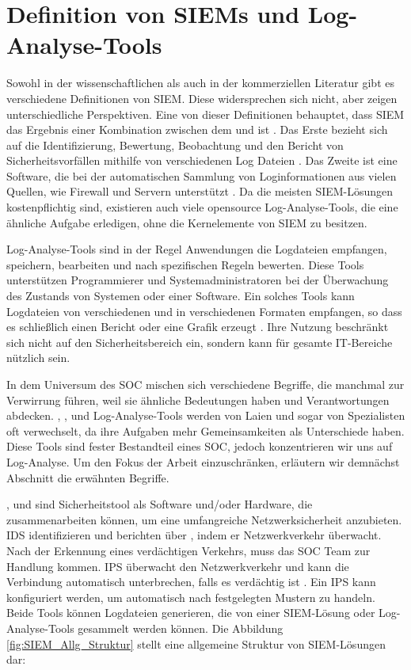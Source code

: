 \section{Definition von SIEMs und Log-Analyse-Tools}

Sowohl in der wissenschaftlichen als auch in der kommerziellen Literatur gibt es verschiedene Definitionen von \gls{SIEM}. Diese widersprechen sich nicht, aber zeigen unterschiedliche Perspektiven. Eine von dieser Definitionen behauptet, dass \gls{SIEM} das Ergebnis einer Kombination zwischen dem  und  ist \citep{Dorigo_SIEM}. Das Erste bezieht sich auf die Identifizierung, Bewertung, Beobachtung und den Bericht von Sicherheitsvorfällen mithilfe von verschiedenen Log Dateien \citep{techopedia_SEM}. Das Zweite ist eine Software, die bei der automatischen Sammlung von Loginformationen aus vielen Quellen, wie Firewall und Servern unterstützt \citep{techopedia_SIM}. Da die meisten \gls{SIEM}-Lösungen kostenpflichtig sind, existieren auch viele \gls{opensource} Log-Analyse-Tools, die eine ähnliche Aufgabe erledigen, ohne die Kernelemente von \gls{SIEM} zu besitzen.

Log-Analyse-Tools sind in der Regel Anwendungen die Logdateien empfangen, speichern, bearbeiten und nach spezifischen Regeln bewerten. Diese Tools unterstützen Programmierer und Systemadministratoren bei der Überwachung des Zustands von Systemen oder einer Software. Ein solches Tools kann Logdateien von verschiedenen  und in verschiedenen Formaten empfangen, so dass es schließlich einen Bericht oder eine Grafik erzeugt \citep{Korzeniowski_LATDef}. Ihre Nutzung beschränkt sich nicht auf den Sicherheitsbereich ein, sondern kann für gesamte IT-Bereiche nützlich sein.

In dem Universum des \gls{SOC} mischen sich verschiedene Begriffe, die manchmal zur Verwirrung führen, weil sie ähnliche Bedeutungen haben und Verantwortungen abdecken. , ,  und Log-Analyse-Tools werden von Laien und sogar von Spezialisten oft verwechselt, da ihre Aufgaben mehr Gemeinsamkeiten als Unterschiede haben. Diese Tools sind fester Bestandteil eines \gls{SOC}, jedoch konzentrieren wir uns auf Log-Analyse. Um den Fokus der Arbeit einzuschränken, erläutern wir demnächst Abschnitt die erwähnten Begriffe.

,  und  sind Sicherheitstool als Software und/oder Hardware, die zusammenarbeiten können, um eine umfangreiche Netzwerksicherheit anzubieten. \gls{IDS} identifizieren und berichten über , indem er Netzwerkverkehr überwacht. Nach der Erkennung eines verdächtigen Verkehrs, muss das \gls{SOC} Team zur Handlung kommen. \gls{IPS} überwacht den Netzwerkverkehr und kann die Verbindung automatisch unterbrechen, falls es verdächtig ist \citep{Wendzel_IS}. Ein \gls{IPS} kann konfiguriert werden, um automatisch nach festgelegten Mustern zu handeln. Beide Tools können Logdateien generieren, die von einer \gls{SIEM}-Lösung oder Log-Analyse-Tools gesammelt werden können. Die Abbildung \ref{fig:SIEM_Allg_Struktur} stellt eine allgemeine Struktur von \gls{SIEM}-Lösungen dar:

